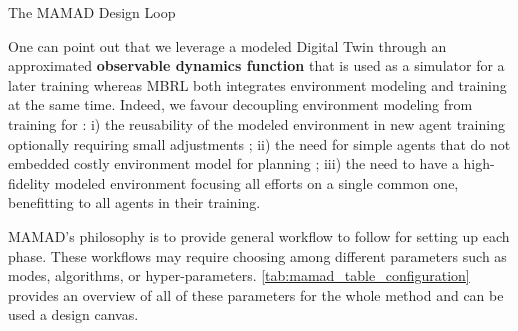 \documentclass[pdflatex,sn-mathphys-num]{sn-jnl}%
\theoremstyle{thmstyleone}%
\theoremstyle{thmstyletwo}%
\theoremstyle{thmstylethree}%
\begin{document}
\begin{algorithm}[H]
    \caption{The MAMAD Design Loop}
    \label{alg:mamad-loop}
    \DontPrintSemicolon
\end{algorithm}

One can point out that we leverage a modeled Digital Twin through an approximated \textbf{observable dynamics function} that is used as a simulator for a later training whereas MBRL both integrates environment modeling and training at the same time. Indeed, we favour decoupling environment modeling from training for : i) the reusability of the modeled environment in new agent training optionally requiring small adjustments ; \quad ii) the need for simple agents that do not embedded costly environment model for planning ; \quad iii) the need to have a high-fidelity modeled environment focusing all efforts on a single common one, benefitting to all agents in their training.

MAMAD's philosophy is to provide general workflow to follow for setting up each phase. These workflows may require choosing among different parameters such as modes, algorithms, or hyper-parameters. \autoref{tab:mamad_table_configuration} provides an overview of all of these parameters for the whole method and can be used a design canvas.
\end{document}
